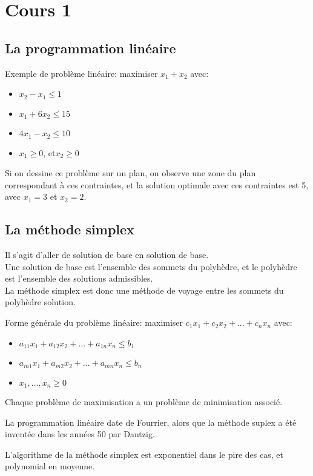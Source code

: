 \section{Cours 1}
\subsection{La programmation linéaire}
Exemple de problème linéaire:
maximiser $x_1 + x_2$ avec:
\begin{itemize}
    \item $x_2 - x_1 \leq 1$
    \item $x_1 + 6 x_2 \leq 15$
    \item $4x_1 - x_2 \leq 10$
    \item $x_1 \geq 0$, et$x_2 \geq 0$
\end{itemize}

Si on dessine ce problème sur un plan, on observe une
zone du plan correspondant à ces contraintes, et la
solution optimale avec ces contraintes est 5, avec
$x_1 = 3$ et $x_2 = 2$.

\subsection{La méthode simplex}
Il s'agit d'aller de solution de base en solution
de base.\\
Une solution de base est l'ensemble des sommets du
polyhèdre, et le polyhèdre est l'ensemble des solutions
admissibles.\\
La méthode simplex est donc une méthode de voyage entre 
les sommets du polyhèdre solution.

Forme générale du problème linéaire:
maximiser $c_1x_1 + c_2x_2 + ... + c_nx_n$ avec:
\begin{itemize}
    \item $a_{11}x_1 + a_{12}x_2 + ... + a_{1n}x_n \leq b_1$
    \item $a_{m1}x_1 + a_{m2}x_2 + ... + a_{mn}x_n \leq b_n$
    \item $x_1, ..., x_n \geq 0$
\end{itemize}

Chaque problème de maximisation a un problème de
minimisation associé.

La programmation linéaire date de Fourrier, alors que
la méthode suplex a été inventée dans les années 50 par 
Dantzig.

L'algorithme de la méthode simplex est exponentiel dans
le pire des cas, et polynomial en moyenne.

